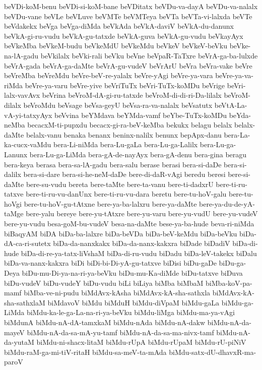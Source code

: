 {beVDi-koM-benu
beVDi-si-koM-bane
beVDitatx
beVDu-va-dayA
beVDu-va-nalalx
beVDu-vane
beVLe
beVLuve
beVMTe
beVMTeya
beVTa
beVTa-vi-lalxda
beVTe
beVdakekx
beVga
beVga-diMda
beVkAda
beVkA-daviV
beVkA-du-danunx
beVkA-gi-ru-vudu
beVkA-gu-tatxde
beVkA-guva
beVkA-gu-vudu
beVkayAyx
beVkeMba
beVkeM-budu
beVkeMdU
beVkeMdu
beVkeV
beVkeV-beVku
beVke-na-lA-gadu
beVkilalx
beVki-rali
beVku
beVne
beVpaR-TaTxre
beVrA-ga-ba-lulxde
beVrA-gada
beVrA-ga-daMte
beVrA-gu-vudeV
beVrArU
beVra
beVra-vake
beVre
beVreMba
beVreMdu
beVre-beV-re-yalalx
beVre-yAgi
beVre-ya-vara
beVre-ya-va-riMda
beVre-ya-varu
beVre-yive
beVriTuTx
beVri-TuTx-koMDu
beVrige
beVri-lalx-vavAvx
beVrina
beVroM-dA-gi-ru-tatxde
beVroM-di-di-ri-Da-lilalx
beVroM-dilalx
beVroMdu
beVsage
beVsa-geyU
beVsa-ra-va-nalalx
beVsatutx
beVtA-La-vA-yi-tatxyAyx
beVvina
beYMdava
beYMda-vamf
beYbe-TuTx-koMDu
beYda-neMba
becacxM-ti-pupxdu
becacx-gi-ra-beV-keMba
bekukx
belagu
belalx
belalx-daMte
belalx-vanu
benaka
benanx
beninx-nalilx
benunx
bepApx-danu
bera-La-ka-cucx-vaMdu
bera-Li-niMda
bera-Lu-gaLa
bera-Lu-ga-Lalilx
bera-Lu-ga-Lanunx
bera-Lu-ga-LiMda
bera-gA-de-nayAyx
bera-gA-denu
bera-gina
beragu
bera-keya
berasa
bera-sa-lA-gadu
bera-salu
berase
berasi
bera-si-daDe
bera-si-dalilx
bera-si-dare
bera-si-he-neM-daDe
bere-di-daR-vAgi
beredu
beresi
bere-si-daMte
bere-su-vudu
bereta
bere-taMte
bere-ta-vanu
bere-ti-dadxrU
bere-ti-ru-tatxve
bere-ti-ru-vu-danUnx
bere-ti-ru-vu-dara
beretu
bere-tu-hoV-galu
bere-tu-hoVgi
bere-tu-hoV-gu-tAtxne
bere-ya-ba-lalxru
bere-ya-daMte
bere-ya-du-de-yA-taMge
bere-yalu
bereye
bere-yu-tAtxre
bere-yu-varu
bere-yu-vudU
bere-yu-vudeV
bere-yu-vudu
besa-goM-bu-vudeV
besa-na-daMte
bese-ya-ba-hude
beva-ri-niMda
biBaqyAM
biDA
biDa-ba-lalxre
biDa-beVDa
biDa-beV-keMdu
biDa-beVku
biDa-dA-ca-ri-sutetx
biDa-da-nanxkakx
biDa-da-nanx-kakxra
biDade
biDadiV
biDa-di-hude
biDa-di-re-ya-tatx-liVshaM
biDa-di-ru-vudu
biDadu
biDa-leV-takekx
biDalu
biDa-va-nanx-kakxra
biDi
biDi-bi-Di-yA-gu-tatxve
biDisi
biDu-gaDe
biDu-ga-Deya
biDu-mu-Di-ya-na-ri-ya-beVku
biDu-mu-Ka-diMde
biDu-tatxve
biDuva
biDu-vudeV
biDu-vudeY
biDu-vudu
biLi
biLiya
biMba
biMbaM
biMba-koV-pa-mamf
biMba-ve-ni-pudu
biMdAvx-kAsha
biMdAvx-kA-sha-sathxla
biMdAvx-kA-sha-sathxlaM
biMdavoV
biMdu
biMduH
biMdu-diVpaM
biMdu-gaLa
biMdu-ga-LiMda
biMdu-ka-le-ga-La-na-ri-ya-beVku
biMdu-liMga
biMdu-ma-ya-vAgi
biMdunA
biMdu-nA-dA-tamxkaM
biMdu-nAda
biMdu-nA-dakw
biMdu-nA-da-mayeV
biMdu-nA-da-sa-mA-yu-tamf
biMdu-nA-da-sa-ma-nivx-tamf
biMdu-nA-da-yutaM
biMdu-ni-shacx-litaM
biMdu-rUpA
biMdu-rUpaM
biMdu-rU-piNiV
biMdu-raM-ga-mi-tiV-ritaH
biMdu-sa-meV-ta-mAda
biMdu-satx-dU-dhavxR-ma-paroV
}

